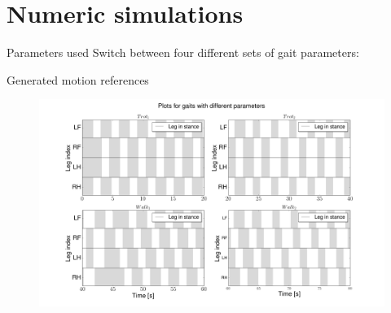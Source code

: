 \documentclass{beamer}
\begin{document}
\section{Numeric simulations}


\begin{frame}{Parameters used}
Switch between four different sets of gait parameters:
\begin{table}[b]
\centering
\label{Table:GaitParameters}
\end{table}
\end{frame}

\begin{frame}{Generated motion references}
\begin{figure}[H]\centering
	\includegraphics[width=1\textwidth]{SyncPlot.png}
\end{figure}
\end{frame}
\end{document}
